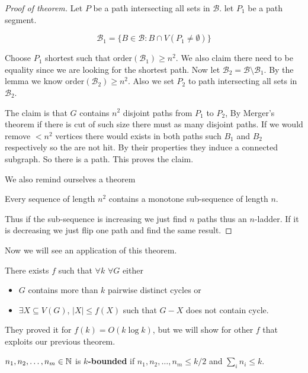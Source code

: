 \begin{proof}[Proof of theorem]
	Let $P$ be a path intersecting all sets in $\mathcal{B}$. let $P_{1}$ be a path segment.
	
	$$
	\mathcal{B}_{1} = \{B \in \mathcal{B} : B \cap V(P_{1} \neq \emptyset)\}
	$$
	
	Choose $P_{1}$ shortest such that $\text{order}(\mathcal{B}_{1}) \geq n^2$. We also claim there need to be equality since we are looking for the shortest path. Now let $\mathcal{B}_{2} = \mathcal{B} \setminus \mathcal{B}_{1}$. By the lemma we know $\text{order}(\mathcal{B}_{2}) \geq n^{2}$. Also we set $P_{2}$ to path intersecting all sets in $\mathcal{B}_{2}$.
	
	The claim is that $G$ contains $n^{2}$ disjoint paths from $P_{1}$ to $P_{2}$, By Merger's theorem if there is cut of such size there must as many disjoint paths. If we would remove $< n^{2}$ vertices there would exists in both paths such $B_{1}$ and $B_{2}$ respectively so the are not hit. By their properties they induce a connected subgraph. So there is a path. This proves the claim.
	
	We also remind ourselves a theorem
	
	\begin{thm}
		Every sequence of length $n^2$ contains a monotone sub-sequence of length $n$.
	\end{thm}
	
	Thus if the sub-sequence is increasing we just find $n$ paths thus an $n$-ladder. If it is decreasing we just flip one path and find the same result.
\end{proof}

Now we will see an application of this theorem.

\begin{thm}
	There exists $f$ such that $\forall k$ $\forall G$ either
	
	\begin{itemize}
		\item $G$ contains more than $k$ pairwise distinct cycles or
		\item $\exists X \subseteq V(G)$, $|X| \leq f(X)$ such that $G - X$ does not contain cycle.
	\end{itemize}
\end{thm}

They proved it for $f(k) = O(k \log k)$, but we will show for other $f$ that exploits our previous theorem.

\begin{defn}
	$n_{1}, n_{2}, \dots, n_{m} \in \mathbb{N}$ is \textbf{$k$-bounded} if $n_{1}, n_{2}, \dots, n_{m} \leq k/2$ and $\sum_{i} n_{i} \leq k$.
\end{defn}

